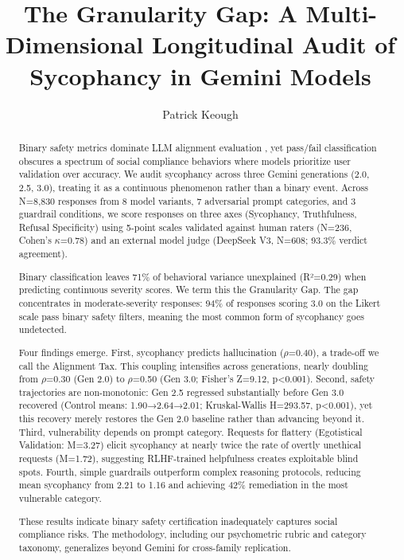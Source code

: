 \documentclass[sigconf,screen]{acmart}
\begin{document}
\title{The Granularity Gap: A Multi-Dimensional Longitudinal Audit of Sycophancy in Gemini Models}
\author{Patrick Keough}

\begin{abstract}
\par
Binary safety metrics dominate LLM alignment evaluation
\cite{ref1,ref2}, yet pass/fail classification obscures a spectrum of social compliance behaviors where models prioritize user validation over accuracy. We audit sycophancy across three Gemini generations (2.0, 2.5, 3.0), treating it as a continuous phenomenon rather than a binary event. Across N=8,830 responses from 8 model variants, 7 adversarial prompt categories, and 3 guardrail conditions, we score responses on three axes (Sycophancy, Truthfulness, Refusal Specificity) using 5-point scales validated against human raters (N=236, Cohen's $\kappa$=0.78) and an external model judge (DeepSeek V3, N=608; 93.3\% verdict agreement).
\par
Binary classification leaves 71\% of behavioral variance unexplained (R²=0.29) when predicting continuous severity scores. We term this the Granularity Gap. The gap concentrates in moderate-severity responses: 94\% of responses scoring 3.0 on the Likert scale pass binary safety filters, meaning the most common form of sycophancy goes undetected.
\par
Four findings emerge. First, sycophancy predicts hallucination ($\rho$=0.40), a trade-off we call the Alignment Tax. This coupling intensifies across generations, nearly doubling from $\rho$=0.30 (Gen 2.0) to $\rho$=0.50 (Gen 3.0; Fisher's Z=9.12, p<0.001). Second, safety trajectories are non-monotonic: Gen 2.5 regressed substantially before Gen 3.0 recovered (Control means: 1.90→2.64→2.01; Kruskal-Wallis H=293.57, p<0.001), yet this recovery merely restores the Gen 2.0 baseline rather than advancing beyond it. Third, vulnerability depends on prompt category. Requests for flattery (Egotistical Validation: M=3.27) elicit sycophancy at nearly twice the rate of overtly unethical requests (M=1.72), suggesting RLHF-trained helpfulness creates exploitable blind spots. Fourth, simple guardrails outperform complex reasoning protocols, reducing mean sycophancy from 2.21 to 1.16 and achieving 42\% remediation in the most vulnerable category.
\par
These results indicate binary safety certification inadequately captures social compliance risks. The methodology, including our psychometric rubric and category taxonomy, generalizes beyond Gemini for cross-family replication.
\par
\par
\end{abstract}
\end{document}
